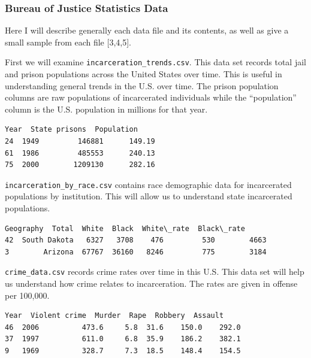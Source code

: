 \documentclass[11pt]{article}
\begin{document}
\hypertarget{bureau-of-justice-statistics-data}{%
\subsubsection{Bureau of Justice Statistics
Data}\label{bureau-of-justice-statistics-data}}

Here I will describe generally each data file and its contents, as well
as give a small sample from each file {[}3,4,5{]}.

    First we will examine \texttt{incarceration\_trends.csv}. This data set
records total jail and prison populations across the United States over
time. This is useful in understanding general trends in the U.S. over
time. The prison population columns are raw populations of incarcerated
individuals while the ``population'' column is the U.S. population in
millions for that year.

    \begin{Verbatim}[commandchars=\\\{\}]
    Year  State prisons  Population
24  1949         146881      149.19
61  1986         485553      240.13
75  2000        1209130      282.16

    \end{Verbatim}

    \texttt{incarceration\_by\_race.csv} contains race demographic data for
incarcerated populations by institution. This will allow us to
understand state incarcerated populations.

    \begin{Verbatim}[commandchars=\\\{\}]
       Geography  Total  White  Black  White\_rate  Black\_rate
42  South Dakota   6327   3708    476         530        4663
3        Arizona  67767  36160   8246         775        3184

    \end{Verbatim}

    \texttt{crime\_data.csv} records crime rates over time in this U.S. This
data set will help us understand how crime relates to incarceration. The
rates are given in offense per 100,000.

    \begin{Verbatim}[commandchars=\\\{\}]
    Year  Violent crime  Murder  Rape  Robbery  Assault
46  2006          473.6     5.8  31.6    150.0    292.0
37  1997          611.0     6.8  35.9    186.2    382.1
9   1969          328.7     7.3  18.5    148.4    154.5

    \end{Verbatim}
\end{document}
